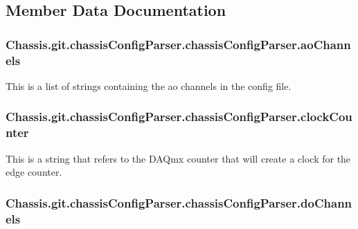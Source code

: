 \subsection{Member Data Documentation}
\hypertarget{class_chassis_8git_1_1chassis_config_parser_1_1chassis_config_parser_aa0cadbc5a2dabc7ec503266ce91282c8}{
\subsubsection[{ao\-Channels}]{\setlength{\rightskip}{0pt plus 5cm}Chassis.\-git.\-chassis\-Config\-Parser.\-chassis\-Config\-Parser.\-ao\-Channels}}\label{class_chassis_8git_1_1chassis_config_parser_1_1chassis_config_parser_aa0cadbc5a2dabc7ec503266ce91282c8}


This is a list of strings containing the ao channels in the config file. 

\hypertarget{class_chassis_8git_1_1chassis_config_parser_1_1chassis_config_parser_aedfd8adf268a65231021c9ad818ba252}{
\subsubsection[{clock\-Counter}]{\setlength{\rightskip}{0pt plus 5cm}Chassis.\-git.\-chassis\-Config\-Parser.\-chassis\-Config\-Parser.\-clock\-Counter}}\label{class_chassis_8git_1_1chassis_config_parser_1_1chassis_config_parser_aedfd8adf268a65231021c9ad818ba252}


This is a string that refers to the D\-A\-Qmx counter that will create a clock for the edge counter. 

\hypertarget{class_chassis_8git_1_1chassis_config_parser_1_1chassis_config_parser_a9de4cc429f9dc26bf12adfb55aea4e62}{
\subsubsection[{do\-Channels}]{\setlength{\rightskip}{0pt plus 5cm}Chassis.\-git.\-chassis\-Config\-Parser.\-chassis\-Config\-Parser.\-do\-Channels}}\label{class_chassis_8git_1_1chassis_config_parser_1_1chassis_config_parser_a9de4cc429f9dc26bf12adfb55aea4e62}


